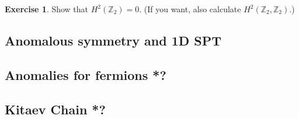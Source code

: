 \documentclass[
]{scrartcl}
\numberwithin{equation}{section}
\theoremstyle{definition}
\theoremstyle{definition}
\theoremstyle{definition}
\newtheorem{exercise}{Exercise}[section]
\theoremstyle{definition}
\theoremstyle{remark}
\begin{document}
\begin{exercise}
Show that \(H^2(\mathbb{Z}_2)=0\). (If you want, also calculate \(H^2(\mathbb{Z}_2,\mathbb{Z}_2)\).)
\end{exercise}

\hypertarget{anomalous-symmetry-and-1d-spt}{%
\subsection{Anomalous symmetry and 1D SPT}\label{anomalous-symmetry-and-1d-spt}}

\hypertarget{anomalies-for-fermions}{%
\subsection{Anomalies for fermions *?}\label{anomalies-for-fermions}}

\hypertarget{kitaev-chain}{%
\subsection{Kitaev Chain *?}\label{kitaev-chain}}

\printbibliography
\end{document}
